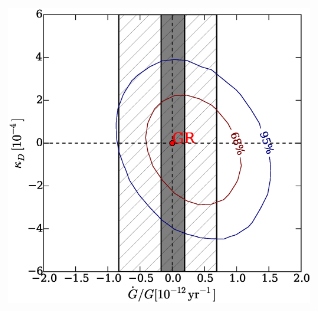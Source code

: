 \documentclass[10pt,preprint]{aastex}
\begin{document}
\begin{figure}
    \includegraphics[width=8cm]{1713_Gdot.ps} \\ 
\end{figure} 
\end{document}
